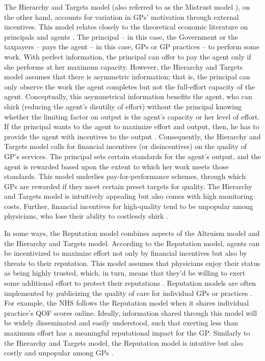 \documentclass[12pt]{article}
\begin{document}
The Hierarchy and Targets model (also referred to as the Mistrust model \citep{legrandOtherInvisibleHand2007}), on the other hand, accounts for variation in GPs' motivation through external incentives. This model relates closely to the theoretical economic literature on principals and agents \citep{jensenTheoryFirmManagerial1976}. The principal -- in this case, the Government or the taxpayers -- pays the agent -- in this case, GPs or GP practices -- to perform some work. With perfect information, the principal can offer to pay the agent only if she performs at her maximum capacity. However, the Hierarchy and Targets model assumes that there is asymmetric information; that is, the principal can only observe the work the agent completes but not the full-effort capacity of the agent. Conceptually, this asymmetrical information benefits the agent, who can shirk (reducing the agent's disutiliy of effort) without the principal knowing whether the limiting factor on output is the agent's capacity or her level of effort. If the principal wants to the agent to maximize effort and output, then, he has to provide the agent with incentives to the output \citep{connEffortEfficiencyIncentives1982}. Consequently, the Hierarchy and Targets model calls for financial incentives (or disincentives) on the quality of GP's services. The principal sets certain standards for the agent's output, and the agent is rewarded based upon the extent to which her work meets those standards. This model underlies pay-for-performance schemes, through which GPs are rewarded if they meet certain preset targets for quality. The Hierarchy and Targets model is intuitively appealing but also comes with high monitoring costs. Further, financial incentives for high-quality tend to be unpopular among physicians, who lose their ability to costlessly shirk \citep{legrandOtherInvisibleHand2007}.

In some ways, the Reputation model combines aspects of the Altruism model and the Hierarchy and Targets model. According to the Reputation model, agents can be incentivized to maximize effort not only by financial incentives but also by threats to their reputation. This model assumes that physicians enjoy their status as being highly trusted, which, in turn, means that they'd be willing to exert some additional effort to protect their reputations \citep{wachterPersonalAccountabilityHealthcare2013}. Reputation models are often implemented by publicizing the quality of care for individual GPs or practices \citep{jarvisWhatCanCanada2012}. For example, the NHS follows the Reputation model when it shares individual practice's QOF scores online. Ideally, information shared through this model will be widely disseminated and easily understood, such that exerting less than maximum effort has a meaningful reputational impact for the GP. Similarly to the Hierarchy and Targets model, the Reputation model is intuitive but also costly and unpopular among GPs \citep{legrandOtherInvisibleHand2007}.
\end{document}
